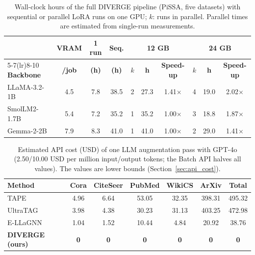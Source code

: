\documentclass[a4paper,fleqn]{cas-sc}
\begin{document}
\begin{table}[htbp]
\centering\color{revshared}
\caption{Wall-clock hours of the full DIVERGE pipeline (PiSSA, five datasets) with sequential or parallel LoRA runs on one GPU; $k$: runs in parallel. Parallel times are estimated from single-run measurements.}
\label{tab:parallel}
\small
\setlength{\tabcolsep}{3pt}
\begin{tabular*}{\columnwidth}{@{\extracolsep{\fill}} lccccccccc @{}}
\toprule
 & \textbf{VRAM} & \textbf{1 run} & \textbf{Seq.} & \multicolumn{3}{c}{\textbf{12 GB}} & \multicolumn{3}{c}{\textbf{24 GB}} \\
\cmidrule(lr){5-7}\cmidrule(lr){8-10}
\textbf{Backbone} & \textbf{/job} & \textbf{(h)} & \textbf{(h)} & $k$ & \textbf{h} & \textbf{Speed-up} & $k$ & \textbf{h} & \textbf{Speed-up} \\
\midrule
LLaMA-3.2-1B & 4.5 & 7.8 & 38.5 & 2 & 27.3 & 1.41$\times$ & 4 & 19.0 & 2.02$\times$ \\
SmolLM2-1.7B & 5.4 & 7.2 & 35.2 & 1 & 35.2 & 1.00$\times$ & 3 & 18.8 & 1.87$\times$ \\
Gemma-2-2B & 7.9 & 8.3 & 41.0 & 1 & 41.0 & 1.00$\times$ & 2 & 29.0 & 1.41$\times$ \\
\bottomrule
\end{tabular*}
\end{table}

\begin{table}[htbp]
\centering\color{red}
\caption{Estimated API cost (USD) of one LLM augmentation pass with GPT-4o (2.50/10.00 USD per million input/output tokens; the Batch API halves all values). The values are lower bounds (Section~\ref{sec:api_cost}).}
\label{tab:api_cost}
\small
\setlength{\tabcolsep}{3pt}
\begin{tabular*}{\columnwidth}{@{\extracolsep{\fill}} lcccccc @{}}
\toprule
\textbf{Method} & \textbf{Cora} & \textbf{CiteSeer} & \textbf{PubMed} & \textbf{WikiCS} & \textbf{ArXiv} & \textbf{Total} \\
\midrule
TAPE & 4.96 & 6.64 & 53.05 & 32.35 & 398.31 & 495.32 \\
UltraTAG & 3.98 & 4.38 & 30.23 & 31.13 & 403.25 & 472.98 \\
E-LLaGNN & 1.04 & 1.52 & 10.44 & 4.84 & 20.92 & 38.76 \\
\midrule
\textbf{DIVERGE (ours)} & \textbf{0} & \textbf{0} & \textbf{0} & \textbf{0} & \textbf{0} & \textbf{0} \\
\bottomrule
\end{tabular*}
\end{table}
\end{document}
